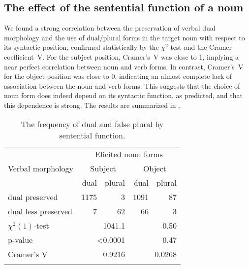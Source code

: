 \documentclass[output=paper,colorlinks,citecolor=brown]{langscibook}
\begin{document}
\subsection{The effect of the sentential function of a noun}\label{pav:sec:sentential-function}
\largerpage
We found a strong correlation between the preservation of verbal dual morphology and the use of dual/plural forms in the target noun with respect to its syntactic position, confirmed statistically by the $\chi^2$-test and the Cramer coefficient~V. For the subject position, Cramer's~V was close to 1, implying a near perfect correlation between noun and verb forms. In contrast, Cramer's~V for  the object position was close to 0, indicating an almost complete lack of association between the noun and verb forms. This suggests that the choice of noun form does indeed depend on its syntactic function, as predicted, and that this dependence is strong. The results are summarized in . 

\begin{table}
    \begin{tabular}{lrrrr}
    \lsptoprule
                    & \multicolumn{4}{c}{Elicited noun forms}                               \\
Verbal morphology   & \multicolumn{2}{c}{Subject} & \multicolumn{2}{c}{Object} \\
\cmidrule(lr){2-3}\cmidrule(lr){4-5}
                    & dual  & plural& dual  &  plural   \\
\midrule
\rowcolor{lightgray}
dual preserved      & 1175  & 3     & 1091  & 87        \\
\cline{2-5}
\rowcolor{lightgray}
dual less preserved & 7     & 62    & 66    & 3         \\

\tablevspace
$\chi^2(1)$-test    & \multicolumn{2}{r}{1041.1} & \multicolumn{2}{r}{0.50}     \\
p-value             & \multicolumn{2}{r}{<0.0001}& \multicolumn{2}{r}{0.47}     \\
Cramer’s V          & \multicolumn{2}{r}{0.9216} & \multicolumn{2}{r}{0.0268}   \\
    \lspbottomrule
    \end{tabular}
    \caption{The frequency of dual and false plural by sentential function.}
    \label{tab:pav:04}
\end{table}
\end{document}
